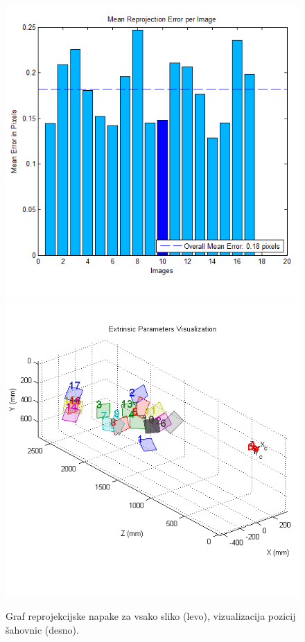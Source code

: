 \documentclass[a4paper, 12pt]{book}
\begin{document}
\begin{figure}[H]
\centering
\includegraphics[scale=0.35]{reprojection_error.png}
\includegraphics[scale=0.35]{extrinsic_visualization.png}
\caption{Graf reprojekcijske napake za vsako sliko (levo), vizualizacija pozicij šahovnic (desno). }
\end{figure}
\end{document}
